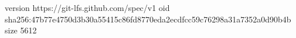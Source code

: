 version https://git-lfs.github.com/spec/v1
oid sha256:47b77e4750d3b30a55415c86fd8770eda2ecdfcc59c76298a31a7352a0d90b4b
size 5612

